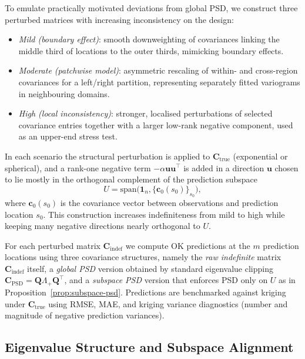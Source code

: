 \documentclass[smallextended]{svjour3}
\newcommand{\1}{\mathbf{1}}
\begin{document}
To emulate practically motivated deviations from global PSD, we construct three perturbed matrices with increasing inconsistency on the design:

\begin{itemize}
	\item \emph{Mild (boundary effect)}: smooth downweighting of covariances linking the middle third of locations to the outer thirds, mimicking 	boundary effects.
	\item \emph{Moderate (patchwise model)}: asymmetric rescaling of within- and 	cross-region covariances for a left/right partition, representing 	separately fitted variograms in neighbouring domains.
	\item \emph{High (local inconsistency)}: stronger, localised perturbations 	of selected covariance entries together with a larger low-rank negative component, used as an upper-end stress test.
\end{itemize}

In each scenario the structural perturbation is applied to $\mathbf{C}_{\mathrm{true}}$ (exponential or spherical), and a rank-one negative term $-\alpha \mathbf{u}\mathbf{u}^\top$ is added in a direction $\mathbf{u}$ chosen to lie mostly in the orthogonal complement of the prediction subspace
\[
U = \mathrm{span}\bigl(\mathbf{1}_n,\{\mathbf{c}_0(s_0)\}_{s_0}\bigr),
\]
where $\mathbf{c}_0(s_0)$ is the covariance vector between observations and prediction location $s_0$. This construction increases indefiniteness from mild to high while keeping many negative directions nearly orthogonal to
$U$.

For each perturbed matrix $\mathbf{C}_{\mathrm{indef}}$ we compute OK predictions at the $m$ prediction locations using three covariance structures, namely the \emph{raw indefinite} matrix $\mathbf{C}_{\mathrm{indef}}$ itself, a \emph{global PSD} version obtained by standard eigenvalue clipping
$\mathbf{C}_{\mathrm{PSD}} = \mathbf{Q}\Lambda_+\mathbf{Q}^\top$, and a \emph{subspace PSD} version that enforces PSD only on $U$ as in Proposition~\ref{prop:subspace-psd}. Predictions are benchmarked against kriging under $\mathbf{C}_{\mathrm{true}}$ using RMSE, MAE, and kriging variance diagnostics (number and magnitude of negative prediction variances).

\subsection{Eigenvalue Structure and Subspace Alignment}
\end{document}
